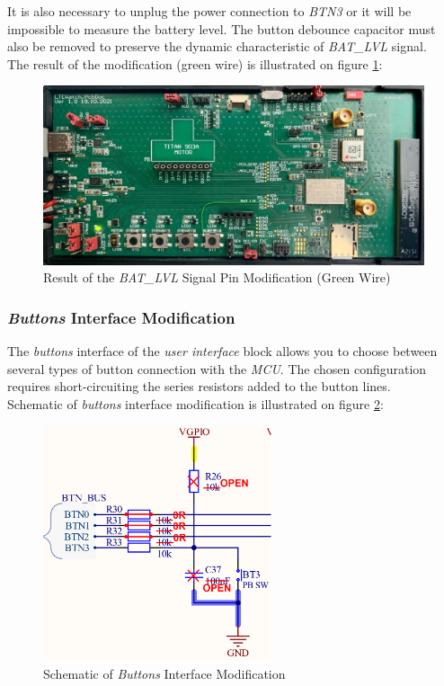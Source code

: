 \documentclass[Report.tex]{subfiles}
\begin{document}
It is also necessary to unplug the power connection to \textit{BTN3} or it will be impossible to measure the battery level. The button debounce capacitor must also be removed to preserve the dynamic characteristic of \textit{BAT\_LVL} signal.\\

The result of the modification (green wire) is illustrated on figure \ref{fig:bord_mod_1}:
\begin{figure}[H]
	\centering
	\includegraphics[width=1\textwidth]{Include/Figure/modification/bord_mod_1}
	\caption{Result of the \textit{BAT\_LVL} Signal Pin Modification (Green Wire)}
	\label{fig:bord_mod_1}
\end{figure}

\subsubsection{\textit{Buttons} Interface Modification}
The \textit{buttons} interface of the \textit{user interface} block allows you to choose between several types of button connection with the \textit{MCU}. The chosen configuration requires short-circuiting the series resistors added to the button lines.\\

Schematic of \textit{buttons} interface modification is illustrated on figure \ref{fig:adc_button_mod}:
\begin{figure}[H]
	\centering
	\includegraphics[width=0.6\textwidth]{Include/Figure/modification/adc_button_mod}
	\caption{Schematic of \textit{Buttons} Interface Modification}
	\label{fig:adc_button_mod}
\end{figure}
\end{document}
